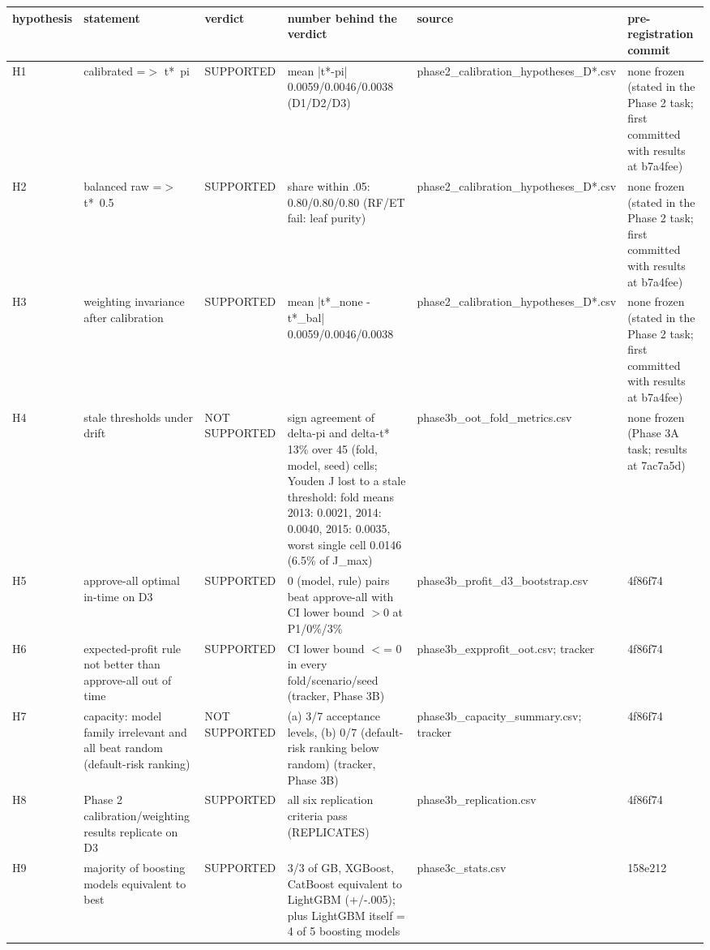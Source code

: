\begin{tabular}{lp{5.2cm}p{5.2cm}p{5.2cm}lp{5.2cm}}
\toprule
hypothesis & statement & verdict & number behind the verdict & source & pre-registration commit \\
\midrule
H1 & calibrated =$>$ t*~pi & SUPPORTED & mean |t*-pi| 0.0059/0.0046/0.0038 (D1/D2/D3) & phase2\_calibration\_hypotheses\_D*.csv & none frozen (stated in the Phase 2 task; first committed with results at b7a4fee) \\
H2 & balanced raw =$>$ t*~0.5 & SUPPORTED & share within .05: 0.80/0.80/0.80 (RF/ET fail: leaf purity) & phase2\_calibration\_hypotheses\_D*.csv & none frozen (stated in the Phase 2 task; first committed with results at b7a4fee) \\
H3 & weighting invariance after calibration & SUPPORTED & mean |t*\_none - t*\_bal| 0.0059/0.0046/0.0038 & phase2\_calibration\_hypotheses\_D*.csv & none frozen (stated in the Phase 2 task; first committed with results at b7a4fee) \\
H4 & stale thresholds under drift & NOT SUPPORTED & sign agreement of delta-pi and delta-t* 13\% over 45 (fold, model, seed) cells; Youden J lost to a stale threshold: fold means 2013: 0.0021, 2014: 0.0040, 2015: 0.0035, worst single cell 0.0146 (6.5\% of J\_max) & phase3b\_oot\_fold\_metrics.csv & none frozen (Phase 3A task; results at 7ac7a5d) \\
H5 & approve-all optimal in-time on D3 & SUPPORTED & 0 (model, rule) pairs beat approve-all with CI lower bound $>$0 at P1/0\%/3\% & phase3b\_profit\_d3\_bootstrap.csv & 4f86f74 \\
H6 & expected-profit rule not better than approve-all out of time & SUPPORTED & CI lower bound $<$= 0 in every fold/scenario/seed (tracker, Phase 3B) & phase3b\_expprofit\_oot.csv; tracker & 4f86f74 \\
H7 & capacity: model family irrelevant and all beat random (default-risk ranking) & NOT SUPPORTED & (a) 3/7 acceptance levels, (b) 0/7 (default-risk ranking below random) (tracker, Phase 3B) & phase3b\_capacity\_summary.csv; tracker & 4f86f74 \\
H8 & Phase 2 calibration/weighting results replicate on D3 & SUPPORTED & all six replication criteria pass (REPLICATES) & phase3b\_replication.csv & 4f86f74 \\
H9 & majority of boosting models equivalent to best & SUPPORTED & 3/3 of GB, XGBoost, CatBoost equivalent to LightGBM (+/-.005); plus LightGBM itself = 4 of 5 boosting models & phase3c\_stats.csv & 158e212 \\

\end{tabular}
